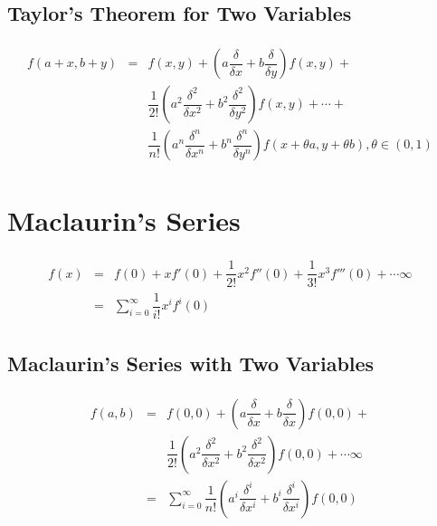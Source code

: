 \subsection{Taylor's Theorem for Two Variables}
\begin{equation}
	\begin{aligned}
		\begin{split}
			f(a+x,b+y)& = &f(x,y)+\left( a\dfrac{\delta}{\delta x}+b\dfrac{\delta}{\delta y}\right)f (x,y)+&\\
			& &\dfrac{1}{2!}\left( a^2\dfrac{\delta^2}{\delta x^2}+b^2\dfrac{\delta^2}{\delta y^2}\right) f(x,y)+\cdots+&\\
			& &\dfrac{1}{n!}\left( a^n\dfrac{\delta^n}{\delta x^n}+b^n\dfrac{\delta^n}{\delta y^n}\right) f(x+\theta a,y+\theta b), \theta \in (0,1)
		\end{split}
	\end{aligned}
\end{equation}


\section{Maclaurin's Series}
\begin{equation}
	\begin{aligned}
		\begin{split}
			f(x)&=&f(0)+xf'(0)+\dfrac{1}{2!}x^2f''(0)+\dfrac{1}{3!}x^3f'''(0)+\cdots\infty&\\
			&=& \sum_{i=0}^\infty \dfrac{1}{i!} x^i f^i(0)
		\end{split}
	\end{aligned}
\end{equation}

\subsection{Maclaurin's Series with Two Variables}
\begin{equation}
	\begin{aligned}
		\begin{split}
			f(a,b)&=&f(0,0)+\left(a\dfrac{\delta}{\delta x}+b\dfrac{\delta}{\delta x}\right)f(0,0)+&\\& &\dfrac{1}{2!}\left(a^2\dfrac{\delta^2}{\delta x^2}+b^2\dfrac{\delta^2}{\delta x^2}\right)f(0,0)+\cdots\infty&\\
			& = & \sum_{i=0}^\infty \dfrac{1}{n!}\left(a^i\dfrac{\delta^i}{\delta x^i}+b^i\dfrac{\delta^i}{\delta x^i}\right)f(0,0)
		\end{split}
	\end{aligned}
\end{equation}


